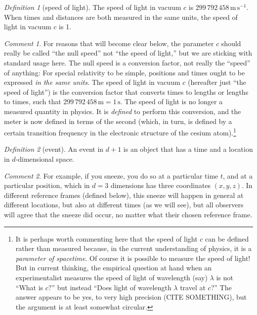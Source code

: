 \documentclass[10pt]{article}
\newcounter{par}
\theoremstyle{remark}
\newtheorem{definition}{Definition}
\theoremstyle{remark}
\newtheorem*{remark}{Comment}
\newcommand{\unit}[1]{\mathrm{#1}}
\newcommand{\m}{\unit{m}}
\newcommand{\s}{\unit{s}}
\begin{document}
\begin{definition}[speed of light]
    The speed of light in vacuum $c$ is $299\,792\,458\,\m\,\s^{-1}$.
    When times and distances are both measured in the same units, the speed of light in vacuum $c$ is 1.
\end{definition}
\begin{remark}
    For reasons that will become clear below, the parameter $c$ should really be called ``the null speed'' not ``the speed of light,'' but we are sticking with standard usage here.
    The null speed is a conversion factor, not really the ``speed'' of anything:
    For special relativity to be simple, positions and times ought to be expressed \emph{in the same units}.
    The speed of light in vacuum $c$ (hereafter just ``the speed of light'') is the conversion factor that converts times to lengths or lengths to times, such that $299\,792\,458\,\m = 1\,\s$.
    The speed of light is no longer a measured quantity in physics.
    It is \emph{defined} to perform this conversion, and the meter is now defined in terms of the second (which, in turn, is defined by a certain transition frequency in the electronic structure of the cesium atom).\footnote{%
        It is perhaps worth commenting here that the speed of light $c$ can be defined rather than measured because, in the current understanding of physics, it is a \emph{parameter of spacetime}.
        Of course it is possible to measure the speed of light!
        But in current thinking, the empirical question at hand when an experimentalist measures the speed of light of wavelength (say) $\lambda$ is not ``What is $c$?'' but instead ``Does light of wavelength $\lambda$ travel at $c$?''
        The answer appears to be yes, to very high precision (CITE SOMETHING), but the argument is at least somewhat circular.}
\end{remark}

\begin{definition}[event]
    An event in $d+1$ is an object that has a time and a location in $d$-dimensional space.
\end{definition}
\begin{remark}
    For example, if you sneeze, you do so at a particular time $t$, and at a particular position, which in $d=3$ dimensions has three coordinates $(x, y, z)$.
    In different reference frames (defined below), this sneeze will happen in general at different locations, but also at different times (as we will see), but all observers will agree that the sneeze did occur, no matter what their chosen reference frame.
\end{remark}
\end{document}
